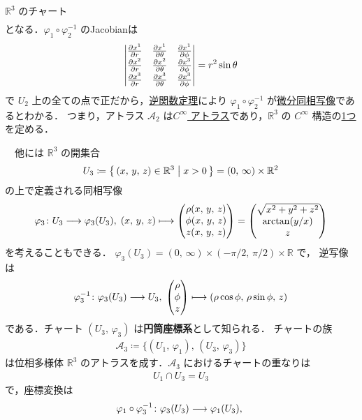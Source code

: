 \documentclass[geometry_main]{subfiles}
\begin{document}
\begin{myexample}[]{$\mathbb{R}^3$ のチャート}
\begin{align}
	\end{align}
	となる．$\varphi_1 \circ \varphi_2^{-1}$ のJacobianは
	\begin{align}
		\mqty|\pdv{x^1}{r} & \pdv{x^1}{\theta} & \pdv{x^1}{\phi} \\ \pdv{x^2}{r} & \pdv{x^2}{\theta} & \pdv{x^3}{\phi} \\ \pdv{x^3}{r} & \pdv{x^3}{\theta} & \pdv{x^3}{\phi}| = r^2 \sin \theta
	\end{align}
	で $U_2$ 上の全ての点で正だから，\hyperref[thm.inverse]{逆関数定理}により $\varphi_1 \circ \varphi_2^{-1}$ が\hyperref[def.diffeomo]{微分同相写像}であるとわかる．
	つまり，アトラス $\mathcal{A}_2$ は\hyperref[diffmani]{$C^\infty$ アトラス}であり，$\mathbb{R}^3$ の $C^\infty$ 構造の\underline{1つ}を定める．

	　他には $\mathbb{R}^3$ の開集合
	\begin{align}
		U_3 \coloneqq \bigl\{\, (x,\, y,\, z) \in \mathbb{R}^3 \bigm| x > 0 \,\bigr\}  = (0,\, \infty) \times \mathbb{R}^2
	\end{align}
	の上で定義される同相写像
	\begin{align}
		\varphi_3 \colon U_3 \lto \varphi_3(U_3),\;
		(x,\, y,\, z) \lmto \mqty(\rho(x,\, y,\, z) \\ \phi(x,\, y,\, z) \\ z(x,\, y,\, z)) = \mqty(\sqrt{x^2 + y^2 + z^2} \\ \arctan(y/x) \\ z)
	\end{align}
	を考えることもできる．
	$\varphi_3(U_3) = (0,\, \infty) \times (-\pi/2,\, \pi/2) \times \mathbb{R}$ で，
	逆写像は
	\begin{align}
		\varphi_3^{-1} \colon \varphi_3 (U_3) \lto U_3,\;
		\mqty(\rho \\  \phi \\ z) \lmto (\rho \cos \phi,\, \rho \sin \phi,\, z)
	\end{align}
	である．チャート $(U_3,\, \varphi_3)$ は\textbf{円筒座標系}として知られる．
	チャートの族
	\begin{align}
		\mathcal{A}_3 \coloneqq \bigl\{(U_1,\, \varphi_1),\, (U_3,\, \varphi_3)  \bigr\}
	\end{align}
	は位相多様体 $\mathbb{R}^3$ のアトラスを成す．$\mathcal{A}_3$ におけるチャートの重なりは
	\begin{align}
		U_1 \cap U_3 = U_3
	\end{align}
	で，座標変換は
	\begin{align}
		\varphi_1 \circ \varphi_3^{-1} \colon \varphi_3(U_3) \lto \varphi_1(U_3), \;

\end{align}
\end{myexample}
\end{document}
